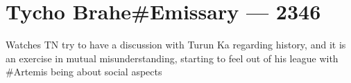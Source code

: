 \hypertarget{tycho-braheemissary-2346}{%
\chapter{Tycho Brahe\#Emissary — 2346}\label{tycho-braheemissary-2346}}

Watches TN try to have a discussion with Turun Ka regarding history, and it is an exercise in mutual misunderstanding, starting to feel out of his league with \#Artemis being about social aspects
